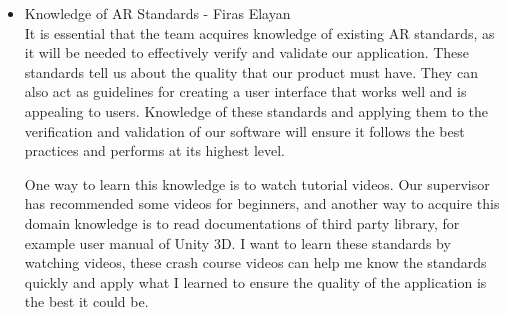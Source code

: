 \documentclass[12pt, titlepage]{article}
\begin{document}
\begin{itemize}

  \item Knowledge of AR Standards - Firas Elayan \\

  It is essential that the team acquires knowledge of existing AR standards, as it will be needed to effectively verify and validate our application. These standards tell us about the quality that our product must have. They can also act as guidelines for creating a user interface that works well and is appealing to users. Knowledge of these standards and applying them to the verification and validation of our software will ensure it follows the best practices and performs at its highest level.
  
  One way to learn this knowledge is to watch tutorial videos. Our supervisor has recommended some videos for beginners, and another way to acquire this domain knowledge is to read documentations of third party library, for example user manual of Unity 3D. I want to learn these standards by watching videos, these crash course videos can help me know the standards quickly and apply what I learned to ensure the quality of the application is the best it could be.\\\\

\end{itemize}
\end{document}
